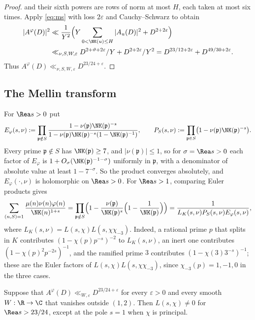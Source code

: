 \begin{proof}
and their sixth powers are rows of norm at most $H$, each taken at most six times. Apply
\eqref{eq:ms} with loss $2\varepsilon$ and Cauchy--Schwarz to obtain
\begin{align}
 |A^\varphi(D)|^2
 &\ll \frac1{Y^2}\Bigl(Y\sum_{0<\NK(u)\le H}|A_u(D)|^2+D^{2+2\varepsilon}\Bigr)\nonumber\\
 &\ll_{\nu,S,W,\varepsilon}D^{2+\vartheta+2\varepsilon}/Y+D^{2+2\varepsilon}/Y^2
   =D^{23/12+2\varepsilon}+D^{49/30+2\varepsilon}.
                                                        \label{eq:prime-extract}
\end{align}
Thus $A^\varphi(D)\ll_{\nu,S,W,\varepsilon}D^{23/24+\varepsilon}$.
\end{proof}

\subsection{The Mellin transform}
For $\Rea s>0$ put
\[
 E_\varphi(s,\nu):=\prod_{\mathfrak p\notin S}
 \frac{1-\nu(\mathfrak p)\NK(\mathfrak p)^{-s}}{1-\nu(\mathfrak p)\NK(\mathfrak p)^{-s}(1-\NK(\mathfrak p)^{-1})},
 \qquad
 P_S(s,\nu):=\prod_{\mathfrak p\in S}\bigl(1-\nu(\mathfrak p)\NK(\mathfrak p)^{-s}\bigr).
\]
Every prime $\mathfrak p\notin S$ has $\NK(\mathfrak p)\ge7$, and $|\nu(\mathfrak p)|\le1$, so for
$\sigma=\Rea s>0$ each factor of $E_\varphi$ is $1+O_\sigma(\NK(\mathfrak p)^{-1-\sigma})$ uniformly
in $\mathfrak p$, with a denominator of absolute value at least $1-7^{-\sigma}$. So the product
converges absolutely, and $E_\varphi(\cdot,\nu)$ is holomorphic on $\Rea s>0$. For $\Rea s>1$,
comparing Euler products gives
\begin{equation}\label{eq:weighted-euler}
 \sum_{(n,S)=1}\frac{\mu(n)\nu(n)\varphi(n)}{\NK(n)^{1+s}}
 =\prod_{\mathfrak p\notin S}\Bigl(1-\frac{\nu(\mathfrak p)}{\NK(\mathfrak p)^{s}}\Bigl(1-\frac1{\NK(\mathfrak p)}\Bigr)\Bigr)
 =\frac1{L_K(s,\nu)P_S(s,\nu)E_\varphi(s,\nu)},
\end{equation}
where $L_K(s,\nu)=L(s,\chi)L(s,\chi\chi_{-3})$. Indeed, a rational prime $p$ that splits in $K$
contributes $(1-\chi(p)p^{-s})^{-2}$ to $L_K(s,\nu)$, an inert one contributes
$(1-\chi(p)^2p^{-2s})^{-1}$, and the ramified prime $3$ contributes $(1-\chi(3)3^{-s})^{-1}$;
these are the Euler factors of $L(s,\chi)L(s,\chi\chi_{-3})$, since $\chi_{-3}(p)=1,-1,0$ in the
three cases.

\begin{proposition}\label{prop:mellin}
Suppose that $A^\varphi(D)\ll_{W,\varepsilon}D^{23/24+\varepsilon}$ for every $\varepsilon>0$ and
every smooth $W:\R\to\C$ that vanishes outside $(1,2)$. Then $L(s,\chi)\ne0$ for
$\Rea s>23/24$, except at the pole $s=1$ when $\chi$ is principal.
\end{proposition}


